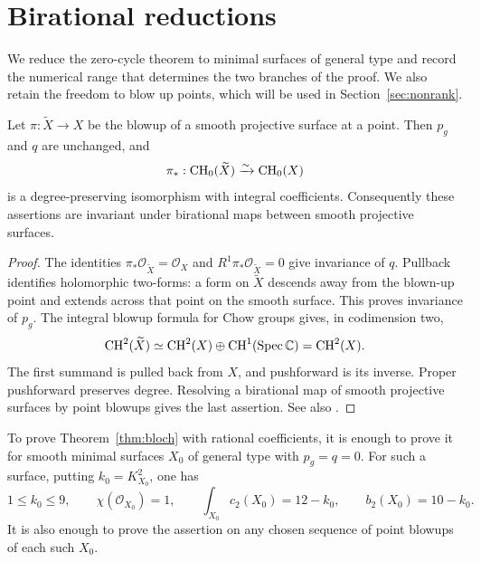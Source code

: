 \section{Birational reductions}\label{sec:reductions}

We reduce the zero-cycle theorem to minimal surfaces of general type
and record the numerical range that determines the two branches of
the proof. We also retain the freedom to blow up points, which will
be used in Section~\ref{sec:nonrank}.

\begin{lemma}\label{lem:birational}
Let \(\pi:\widetilde X\to X\) be the blowup of a smooth projective
surface at a point. Then \(p_g\) and \(q\) are unchanged, and
\[
\pi_*:\operatorname{CH}_0(\widetilde X)\xrightarrow{\sim}\operatorname{CH}_0(X)
\]
is a degree-preserving isomorphism with integral coefficients.
Consequently these assertions are invariant under birational maps
between smooth projective surfaces.
\end{lemma}

\begin{proof}
The identities \(\pi_*\mathcal O_{\widetilde X}=\mathcal O_X\)
and \(R^1\pi_*\mathcal O_{\widetilde X}=0\) give invariance of
\(q\). Pullback identifies holomorphic two-forms: a form on
\(\widetilde X\) descends away from the blown-up point and extends
across that point on the smooth surface. This proves invariance of
\(p_g\). The integral blowup formula for Chow groups
\cite[Proposition~6.7(b), (e)]{Fulton} gives, in codimension two,
\[
\operatorname{CH}^2(\widetilde X)
\simeq\operatorname{CH}^2(X)\oplus\operatorname{CH}^1(\operatorname{Spec}\mathbb C)
=\operatorname{CH}^2(X).
\]
The first summand is pulled back from \(X\), and pushforward is its
inverse. Proper pushforward preserves degree. Resolving a birational
map of smooth projective surfaces by point blowups gives the last
assertion. See also \cite[Section~4, first reduction]{BlochRoitman}.
\end{proof}

\begin{proposition}\label{prop:reduction}
To prove Theorem~\ref{thm:bloch} with rational coefficients, it is
enough to prove it for smooth minimal surfaces \(X_0\) of general
type with \(p_g=q=0\). For such a surface, putting
\(k_0=K_{X_0}^2\), one has
\begin{equation}\label{eq:reduction-invariants}
1\le k_0\le9,\qquad
\chi(\mathcal O_{X_0})=1,\qquad
\int_{X_0}c_2(X_0)=12-k_0,\qquad b_2(X_0)=10-k_0.
\end{equation}
It is also enough to prove the assertion on any chosen sequence of
point blowups of each such \(X_0\).
\end{proposition}

